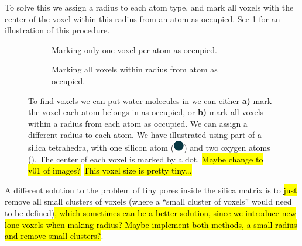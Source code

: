 To solve this we assign a radius to each atom type, and mark all voxels with the center of the voxel within this radius from an atom as occupied. See \cref{fig:inject_empty_voxel} for an illustration of this procedure. 
%
\begin{figure}[htpb]%
    \centering%
    \begin{subfigure}[b]{0.45\textwidth}%
        \caption{Marking only one voxel per atom as occupied.}%
    \end{subfigure}%
    \hspace{0.05\textwidth}%
    \begin{subfigure}[b]{0.45\textwidth}%
        \caption{Marking all voxels within radius from atom as occupied.}%
    \end{subfigure}%
    \caption[
        To find voxels we can put water molecules in we can either \textbf{a)} mark the voxel each atom belongs in as occupied, or \textbf{b)} mark all voxels within a radius from each atom as occupied. We can assign a different radius to each atom. We have illustrated using part of a silica tetrahedra, with one silicon atom (the large blue dot) and two oxygen atoms (the smaller red dot). The center of each voxel is marked by a dot 
    ]{%
        To find voxels we can put water molecules in we can either \textbf{a)} mark the voxel each atom belongs in as occupied, or \textbf{b)} mark all voxels within a radius from each atom as occupied. We can assign a different radius to each atom. We have illustrated using part of a silica tetrahedra, with one silicon atom (\includegraphics[scale=0.8]{./images/inject_water/silicon.pdf}) and two oxygen atoms (). The center of each voxel is marked by a dot. \hl{Maybe change to v01 of images?} \hl{This voxel size is pretty tiny...}
    }%
    \label{fig:inject_empty_voxel}%
\end{figure}%

A different solution to the problem of tiny pores inside the silica matrix is to \hl{just} remove all small clusters of voxels (where a ``small cluster of voxels'' would need to be defined)\hl{, which sometimes can be a better solution, since we introduce new lone voxels when making radius? Maybe implement both methods, a small radius and remove small clusters?}.

